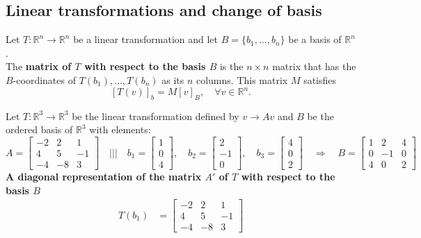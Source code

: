 \documentclass[a4paper, 9pt]{extarticle}
\begin{document}
\subsection{Linear transformations and change of basis}
\begin{definitionbox}{}{}
  Let $T : \mathbb{R}^n \to \mathbb{R}^n$ be a linear transformation and let $B = \{b_1, \ldots, b_n\}$ be a basis of $\mathbb{R}^n$. \\[2ex]
  The \textbf{matrix of $T$ with respect to the basis $B$} is the $n \times n$ matrix that has the $B$-coordinates of $T(b_1), \ldots, T(b_n)$ as its $n$ columns. This matrix $M$ satisfies
  $$
    [T(v)]_b = M[v]_B, \quad \forall v \in \mathbb{R}^n.
  $$
\end{definitionbox}
\begin{examplebox}{}{}
  Let $T: \mathbb{R}^3 \to \mathbb{R}^3$ be the linear transformation defined by $v \to Av$ and $B$ be the ordered basis of $\mathbb{R}^3$ with elements:
  $$
    A =
    \begin{bmatrix}
      -2 & 2  & 1  \\
      4  & 5  & -1 \\
      -4 & -8 & 3
    \end{bmatrix}
    \quad \Bigg| \Bigg| \Bigg|\quad
    b_1 = \begin{bmatrix}
      1 \\
      0 \\
      4
    \end{bmatrix}, \quad
    b_2 = \begin{bmatrix}
      2  \\
      -1 \\
      0
    \end{bmatrix}, \quad
    b_3 = \begin{bmatrix}
      4 \\
      0 \\
      2
    \end{bmatrix}
    \quad\Longrightarrow\quad
    B = \begin{bmatrix}
      1 & 2  & 4 \\
      0 & -1 & 0 \\
      4 & 0  & 2
    \end{bmatrix}
  $$
  \textbf{A diagonal representation of the matrix $A'$ of $T$ with respect to the basis $B$}
  $$
    \begin{aligned}
      T(b_{1})                     & = \begin{bmatrix} -2 & 2 & 1 \\ 4 & 5 & -1 \\ -4 & -8 & 3 \end{bmatrix}

\end{aligned}$$
\end{examplebox}
\end{document}
